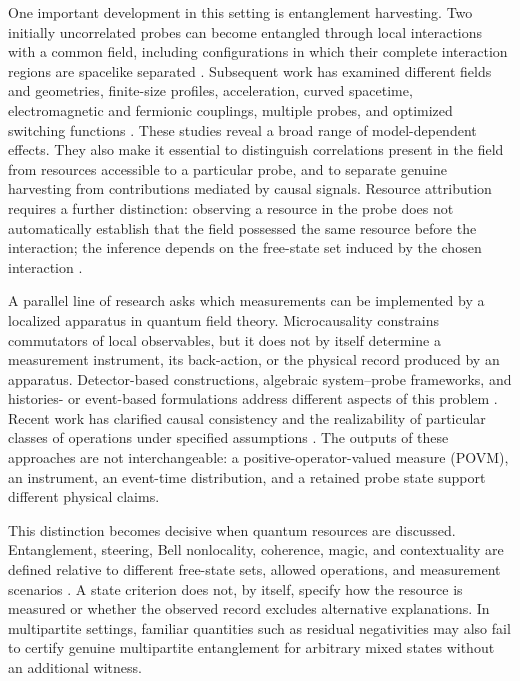 \documentclass[pdflatex,sn-mathphys-num]{sn-jnl}
\begin{document}
One important development in this setting is entanglement harvesting. Two initially uncorrelated probes can become entangled through local interactions with a common field, including configurations in which their complete interaction regions are spacelike separated \cite{Reznik2003,ReznikRetzkerSilman2005,PozasKerstjens2015}. Subsequent work has examined different fields and geometries, finite-size profiles, acceleration, curved spacetime, electromagnetic and fermionic couplings, multiple probes, and optimized switching functions \cite{PozasKerstjensEM2016,Tjoa2021,Zambianco2024,Zambianco2026,MaesoGarcia2022,MoroteBalboaPerche2026,TeixidoBonfill2026,PercheGozzini2026}. These studies reveal a broad range of model-dependent effects. They also make it essential to distinguish correlations present in the field from resources accessible to a particular probe, and to separate genuine harvesting from contributions mediated by causal signals. Resource attribution requires a further distinction: observing a resource in the probe does not automatically establish that the field possessed the same resource before the interaction; the inference depends on the free-state set induced by the chosen interaction \cite{Nystrom2026Induced}.

A parallel line of research asks which measurements can be implemented by a localized apparatus in quantum field theory. Microcausality constrains commutators of local observables, but it does not by itself determine a measurement instrument, its back-action, or the physical record produced by an apparatus. Detector-based constructions, algebraic system--probe frameworks, and histories- or event-based formulations address different aspects of this problem \cite{Sorkin1993,BorstenJubbKells2021,PoloGomez2022,FewsterVerch2020,AnastopoulosSavvidou2012,AnastopoulosSavvidou2019,Papageorgiou2024}. Recent work has clarified causal consistency and the realizability of particular classes of operations under specified assumptions \cite{BostelmannFewsterRuep2021,FewsterJubbRuep2023,MandryschNavascues2025,MandryschSimmonsNavascues2026,Oeckl2026,Simmons2026}. The outputs of these approaches are not interchangeable: a positive-operator-valued measure (POVM), an instrument, an event-time distribution, and a retained probe state support different physical claims.

This distinction becomes decisive when quantum resources are discussed. Entanglement, steering, Bell nonlocality, coherence, magic, and contextuality are defined relative to different free-state sets, allowed operations, and measurement scenarios \cite{HorodeckiEtAl2009,WisemanJonesDoherty2007,Uola2020,BaumgratzCramerPlenio2014,StreltsovAdessoPlenio2017,Howard2014,Schmid2022,Spekkens2005}. A state criterion does not, by itself, specify how the resource is measured or whether the observed record excludes alternative explanations. In multipartite settings, familiar quantities such as residual negativities may also fail to certify genuine multipartite entanglement for arbitrary mixed states without an additional witness.
\end{document}
